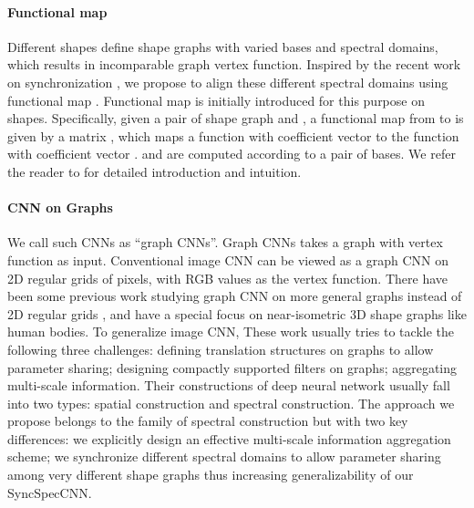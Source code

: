 \documentclass[10pt,twocolumn,letterpaper]{article}
\newcommand{\cmt}[2]{[#1: #2]}
\newcommand{\todo}[1]{\cmt{{\bf TODO}}{{\bf \color{blue} #1}}}
\newcommand{\mypara}{\vspace*{-15pt}\paragraph}
\begin{document}
\mypara{Functional map}
Different shapes define shape graphs with varied bases and spectral domains, which results in incomparable graph vertex function. Inspired by the recent work on synchronization \cite{singer2011angular,wang2013image,wang2014unsupervised}, we propose to align these different spectral domains using functional map \cite{ovsjanikov2012functional}. Functional map is initially introduced for this purpose on shapes. Specifically, given a pair of shape graph  and , a functional map from  to  is given by a matrix , which maps a function  with coefficient vector  to the function   with coefficient vector .  and  are computed according to a pair of bases. We refer the reader to \cite{ovsjanikov2012functional} for detailed introduction and intuition.  
\iffalse
\todo{
  \begin{itemize}
    \item each shape defines a different shape graph, thus different graph laplacian. 
    \item consequently, they generate individual bases, thus independent spectral domain.
    \item Therefore, functions defined on different shapes are not directly comparable, because the spectral domain they live in are not aligned.
    \item functional map is introduced to align the spectral domain of different shapes. specifically, given a pair of shape graph  and , a functional map from  to  is given by a matrix , which maps a function  with coefficient vector  to the function   with coefficient vector .  and  are computed according to a pair of bases. We refer the reader to CITATION for a more detailed introduction and intuition. 
\end{itemize} 
}
\fi

\mypara{CNN on Graphs}
We call such CNNs as ``graph CNNs''. Graph CNNs takes a graph with vertex function as input. Conventional image CNN can be viewed as a graph CNN on 2D regular grids of pixels, with RGB values as the vertex function. There have been some previous work studying graph CNN on more general graphs instead of 2D regular grids \cite{bruna2013spectral,duvenaud2015convolutional,henaff2015deep,defferrard2016convolutional}, and \cite{masci2015geodesic,boscaini2015learning,boscaini2016learning} have a special focus on near-isometric 3D shape graphs like human bodies. To generalize image CNN, These work usually tries to tackle the following three challenges: defining translation structures on graphs to allow parameter sharing; designing compactly supported filters on graphs; aggregating multi-scale information. Their constructions of deep neural network usually fall into two types: spatial construction and spectral construction. The approach we propose belongs to the family of spectral construction but with two key differences: we explicitly design an effective multi-scale information aggregation scheme; we synchronize different spectral domains to allow parameter sharing among very different shape graphs thus increasing generalizability of our SyncSpecCNN.
\end{document}
